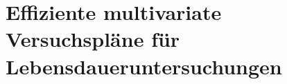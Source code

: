 

\chapter{Effiziente multivariate Versuchspläne für Lebensdaueruntersuchungen} \label{chap:entwurf}